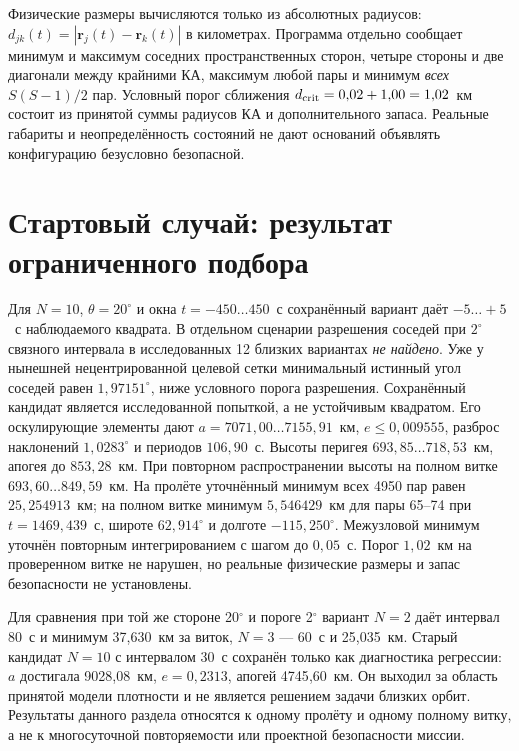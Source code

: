 \documentclass[a4paper,12pt]{article}
\begin{document}
Физические размеры вычисляются только из абсолютных радиусов:
$d_{jk}(t)=|\mathbf r_j(t)-\mathbf r_k(t)|$ в километрах.
Программа отдельно сообщает минимум и максимум соседних
пространственных сторон, четыре стороны и две диагонали между
крайними КА, максимум любой пары и минимум \emph{всех}
$S(S-1)/2$ пар. Условный порог сближения
$d_{\rm crit}=0{,}02+1{,}00=1{,}02$~км состоит из принятой суммы
радиусов КА и дополнительного запаса. Реальные габариты и
неопределённость состояний не дают оснований объявлять конфигурацию
безусловно безопасной.

\section{Стартовый случай: результат ограниченного подбора}

Для $N=10$, $\theta=20^\circ$ и окна $t=-450\ldots450$~с
сохранённый вариант даёт $-5\ldots+5$~с наблюдаемого квадрата.
В отдельном сценарии разрешения соседей при $2^\circ$
связного интервала в исследованных 12 близких вариантах
\emph{не найдено}. Уже у нынешней нецентрированной целевой сетки
минимальный истинный угол соседей равен $1{,}97151^\circ$,
ниже условного порога разрешения. Сохранённый кандидат является
исследованной попыткой, а не устойчивым квадратом.
Его оскулирующие элементы дают $a=7071{,}00\ldots7155{,}91$~км,
$e\leq0{,}009555$, разброс наклонений $1{,}0283^\circ$ и
периодов $106{,}90$~с. Высоты перигея
$693{,}85\ldots718{,}53$~км, апогея до $853{,}28$~км.
При повторном распространении высоты на полном витке
$693{,}60\ldots849{,}59$~км. На пролёте уточнённый минимум
всех 4950 пар равен $25{,}254913$~км; на полном витке
минимум $5{,}546429$~км для пары 65--74 при
$t=1469{,}439$~с, широте $62{,}914^\circ$ и долготе
$-115{,}250^\circ$. Межузловой минимум уточнён повторным
интегрированием с шагом до $0{,}05$~с. Порог $1{,}02$~км
на проверенном витке не нарушен, но реальные физические
размеры и запас безопасности не установлены.

Для сравнения при той же стороне 20$^\circ$ и пороге 2$^\circ$
вариант $N=2$ даёт интервал 80~с и минимум 37{,}630~км
за виток, $N=3$ --- 60~с и 25{,}035~км. Старый
кандидат $N=10$ с интервалом 30~с сохранён только как
диагностика регрессии: $a$ достигала 9028{,}08~км,
$e=0{,}2313$, апогей 4745{,}60~км. Он выходил за
область принятой модели плотности и не является решением
задачи близких орбит. Результаты данного раздела относятся
к одному пролёту и одному полному витку, а не к многосуточной
повторяемости или проектной безопасности миссии.
\end{document}
